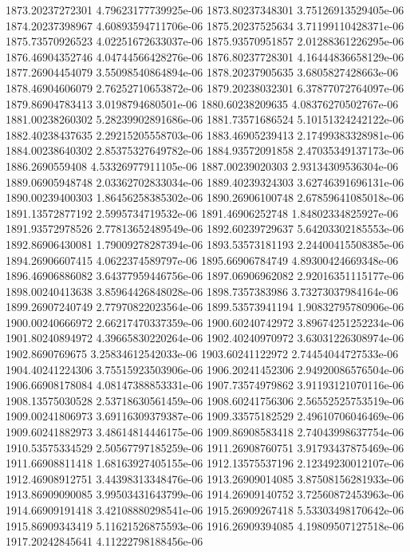 {1873.20237272301 4.79623177739925e-06
1873.80237348301 3.75126913529405e-06
1874.20237398967 4.60893594711706e-06
1875.20237525634 3.71199110428371e-06
1875.73570926523 4.02251672633037e-06
1875.93570951857 2.01288361226295e-06
1876.46904352746 4.04744566428276e-06
1876.80237728301 4.16444836658129e-06
1877.26904454079 3.55098540864894e-06
1878.20237905635 3.6805827428663e-06
1878.46904606079 2.76252710653872e-06
1879.20238032301 6.37877072764097e-06
1879.86904783413 3.0198794680501e-06
1880.60238209635 4.08376270502767e-06
1881.00238260302 5.28239902891686e-06
1881.73571686524 5.10151324242122e-06
1882.40238437635 2.29215205558703e-06
1883.46905239413 2.17499383328981e-06
1884.00238640302 2.85375327649782e-06
1884.93572091858 2.47035349137173e-06
1886.2690559408 4.53326977911105e-06
1887.00239020303 2.93134309536304e-06
1889.06905948748 2.03362702833034e-06
1889.40239324303 3.62746391696131e-06
1890.00239400303 1.86456258385302e-06
1890.26906100748 2.67859641085018e-06
1891.13572877192 2.5995734719532e-06
1891.46906252748 1.84802334825927e-06
1891.93572978526 2.77813652489549e-06
1892.60239729637 5.64203302185553e-06
1892.86906430081 1.79009278287394e-06
1893.53573181193 2.24400415508385e-06
1894.26906607415 4.0622374589797e-06
1895.66906784749 4.89300424669348e-06
1896.46906886082 3.64377959446756e-06
1897.06906962082 2.92016351115177e-06
1898.00240413638 3.85964426848028e-06
1898.7357383986 3.73273037984164e-06
1899.26907240749 2.77970822023564e-06
1899.53573941194 1.90832795780906e-06
1900.00240666972 2.66217470337359e-06
1900.60240742972 3.89674251252234e-06
1901.80240894972 4.39665830220264e-06
1902.40240970972 3.63031226308974e-06
1902.8690769675 3.25834612542033e-06
1903.60241122972 2.74454044727533e-06
1904.40241224306 3.75515923503906e-06
1906.20241452306 2.94920086576504e-06
1906.66908178084 4.08147388853331e-06
1907.73574979862 3.91193121070116e-06
1908.13575030528 2.53718630561459e-06
1908.60241756306 2.56552525753519e-06
1909.00241806973 3.69116309379387e-06
1909.33575182529 2.49610706046469e-06
1909.60241882973 3.48614814446175e-06
1909.86908583418 2.74043998637754e-06
1910.53575334529 2.50567797185259e-06
1911.26908760751 3.91793437875469e-06
1911.66908811418 1.68163927405155e-06
1912.13575537196 2.12349230012107e-06
1912.46908912751 3.44398313348476e-06
1913.26909014085 3.87508156281933e-06
1913.86909090085 3.99503431643799e-06
1914.26909140752 3.72560872453963e-06
1914.66909191418 3.42108880298541e-06
1915.26909267418 5.53303498170642e-06
1915.86909343419 5.11621526875593e-06
1916.26909394085 4.19809507127518e-06
1917.20242845641 4.11222798188456e-06
}
